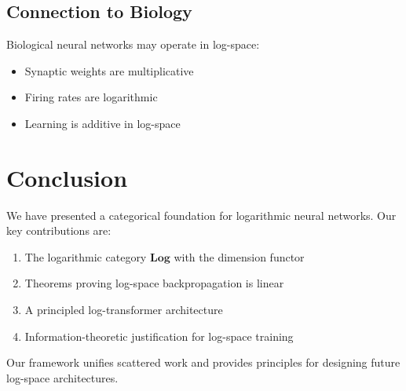 \documentclass{article}
\begin{document}
\subsection{Connection to Biology}

Biological neural networks may operate in log-space:
\begin{itemize}
    \item Synaptic weights are multiplicative
    \item Firing rates are logarithmic
    \item Learning is additive in log-space
\end{itemize}

\section{Conclusion}

We have presented a categorical foundation for logarithmic neural networks. Our key contributions are:
\begin{enumerate}
    \item The logarithmic category $\mathbf{Log}$ with the dimension functor
    \item Theorems proving log-space backpropagation is linear
    \item A principled log-transformer architecture
    \item Information-theoretic justification for log-space training
\end{enumerate}

Our framework unifies scattered work and provides principles for designing future log-space architectures.



\end{document}

